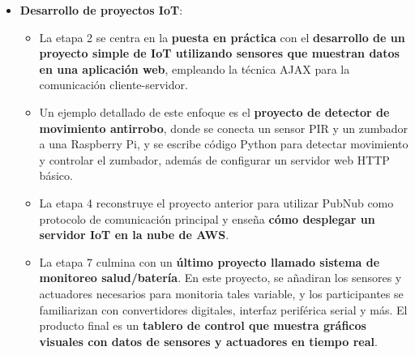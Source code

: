 \documentclass{report}
\begin{document}
\begin{itemize}
    \item \textbf{Desarrollo de proyectos IoT}:
    \begin{itemize}
        \item La etapa 2 se centra en la \textbf{puesta en práctica} con el \textbf{desarrollo de un proyecto simple de IoT 
        utilizando sensores que muestran datos en una aplicación web}, empleando la técnica AJAX para la comunicación cliente-servidor.
        \item Un ejemplo detallado de este enfoque es el \textbf{proyecto de detector de movimiento antirrobo}, donde se conecta 
        un sensor PIR y un zumbador a una Raspberry Pi, y se escribe código Python para detectar movimiento y controlar el zumbador, 
        además de configurar un servidor web HTTP básico.
        \item La etapa 4 reconstruye el proyecto anterior para utilizar PubNub como protocolo de comunicación principal y enseña 
        \textbf{cómo desplegar un servidor IoT en la nube de AWS}.
        \item La etapa 7 culmina con un \textbf{último proyecto llamado sistema de monitoreo salud/batería}. En este proyecto, se 
        añadiran los sensores y actuadores necesarios para monitoria tales variable, y los participantes se familiarizan con 
        convertidores digitales, interfaz periférica serial y más. El producto final es un \textbf{tablero de control 
        que muestra gráficos visuales con datos de sensores y actuadores en tiempo real}.
    \end{itemize}


\end{itemize}
\end{document}
